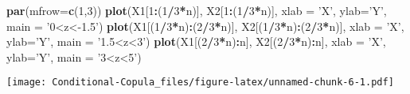 \documentclass[]{article}
\newenvironment{Shaded}{\begin{snugshade}}{\end{snugshade}}
\newcommand{\KeywordTok}[1]{\textcolor[rgb]{0.13,0.29,0.53}{\textbf{#1}}}
\newcommand{\DataTypeTok}[1]{\textcolor[rgb]{0.13,0.29,0.53}{#1}}
\newcommand{\DecValTok}[1]{\textcolor[rgb]{0.00,0.00,0.81}{#1}}
\newcommand{\StringTok}[1]{\textcolor[rgb]{0.31,0.60,0.02}{#1}}
\newcommand{\OperatorTok}[1]{\textcolor[rgb]{0.81,0.36,0.00}{\textbf{#1}}}
\newcommand{\NormalTok}[1]{#1}
\begin{document}
\begin{Shaded}
\begin{Highlighting}[]
\KeywordTok{par}\NormalTok{(}\DataTypeTok{mfrow=}\KeywordTok{c}\NormalTok{(}\DecValTok{1}\NormalTok{,}\DecValTok{3}\NormalTok{))}
\KeywordTok{plot}\NormalTok{(X1[}\DecValTok{1}\OperatorTok{:}\NormalTok{(}\DecValTok{1}\OperatorTok{/}\DecValTok{3}\OperatorTok{*}\NormalTok{n)], X2[}\DecValTok{1}\OperatorTok{:}\NormalTok{(}\DecValTok{1}\OperatorTok{/}\DecValTok{3}\OperatorTok{*}\NormalTok{n)],  }\DataTypeTok{xlab =} \StringTok{'X'}\NormalTok{, }\DataTypeTok{ylab=}\StringTok{'Y'}\NormalTok{, }\DataTypeTok{main =} \StringTok{'0<z<-1.5'}\NormalTok{)}
\KeywordTok{plot}\NormalTok{(X1[(}\DecValTok{1}\OperatorTok{/}\DecValTok{3}\OperatorTok{*}\NormalTok{n)}\OperatorTok{:}\NormalTok{(}\DecValTok{2}\OperatorTok{/}\DecValTok{3}\OperatorTok{*}\NormalTok{n)], X2[(}\DecValTok{1}\OperatorTok{/}\DecValTok{3}\OperatorTok{*}\NormalTok{n)}\OperatorTok{:}\NormalTok{(}\DecValTok{2}\OperatorTok{/}\DecValTok{3}\OperatorTok{*}\NormalTok{n)], }\DataTypeTok{xlab =} \StringTok{'X'}\NormalTok{, }\DataTypeTok{ylab=}\StringTok{'Y'}\NormalTok{, }\DataTypeTok{main =} \StringTok{'1.5<z<3'}\NormalTok{)}
\KeywordTok{plot}\NormalTok{(X1[(}\DecValTok{2}\OperatorTok{/}\DecValTok{3}\OperatorTok{*}\NormalTok{n)}\OperatorTok{:}\NormalTok{n], X2[(}\DecValTok{2}\OperatorTok{/}\DecValTok{3}\OperatorTok{*}\NormalTok{n)}\OperatorTok{:}\NormalTok{n], }\DataTypeTok{xlab =} \StringTok{'X'}\NormalTok{, }\DataTypeTok{ylab=}\StringTok{'Y'}\NormalTok{, }\DataTypeTok{main =} \StringTok{'3<z<5'}\NormalTok{)}
\end{Highlighting}
\end{Shaded}

\texttt{[image: Conditional-Copula\_files/figure-latex/unnamed-chunk-6-1.pdf]}
\end{document}
